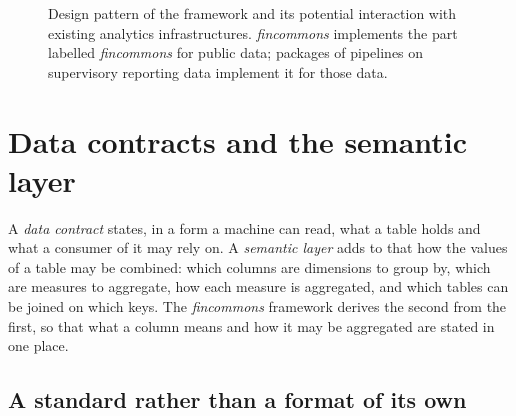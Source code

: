 \documentclass[a4paper, 11pt]{report}
\begin{document}
\begin{figure}[h]
	\caption{Design pattern of the framework and its potential interaction with existing analytics infrastructures. \emph{fincommons} implements the part labelled \emph{fincommons} for public data; packages of pipelines on supervisory reporting data implement it for those data.}
	\label{fig:framework-overview}
\end{figure}


\section{Data contracts and the semantic layer\label{sec:intro-contracts}}

A \emph{data contract} states, in a form a machine can read, what a table holds and what a consumer of it may rely on. A \emph{semantic layer} adds to that how the values of a table may be combined: which columns are dimensions to group by, which are measures to aggregate, how each measure is aggregated, and which tables can be joined on which keys. The \emph{fincommons} framework derives the second from the first, so that what a column means and how it may be aggregated are stated in one place.

\subsection{A standard rather than a format of its own}
\end{document}
